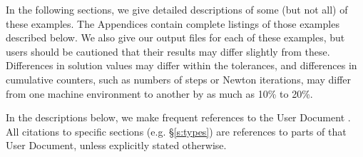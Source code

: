 In the following sections, we give detailed descriptions of some (but
not all) of these examples.  The Appendices contain complete listings
of those examples described below.  We also give our output files for
each of these examples, but users should be cautioned that their
results may differ slightly from these.  Differences in solution
values may differ within the tolerances, and differences in cumulative
counters, such as numbers of steps or Newton iterations, may differ
from one machine environment to another by as much as 10\% to 20\%.

In the descriptions below, we make frequent references to the {\kinsol}
User Document \cite{kinsol2.2.0_ug}.  All citations to specific sections
(e.g. \S\ref{s:types}) are references to parts of that User Document, unless
explicitly stated otherwise.
